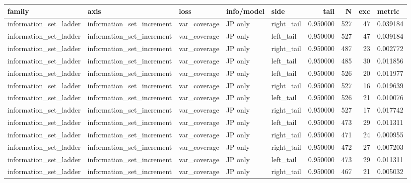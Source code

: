 \begin{tabular}{lllllrrr}
\toprule
family & axis & loss & info/model & side & tail & N & exc & metric \\
\midrule
information\_set\_ladder & information\_set\_increment & var\_coverage & JP only & right\_tail & 0.950000 & 527 & 47 & 0.039184 \\
information\_set\_ladder & information\_set\_increment & var\_coverage & JP only & left\_tail & 0.950000 & 527 & 47 & 0.039184 \\
information\_set\_ladder & information\_set\_increment & var\_coverage & JP only & right\_tail & 0.950000 & 487 & 23 & 0.002772 \\
information\_set\_ladder & information\_set\_increment & var\_coverage & JP only & left\_tail & 0.950000 & 485 & 30 & 0.011856 \\
information\_set\_ladder & information\_set\_increment & var\_coverage & JP only & left\_tail & 0.950000 & 526 & 20 & 0.011977 \\
information\_set\_ladder & information\_set\_increment & var\_coverage & JP only & right\_tail & 0.950000 & 527 & 16 & 0.019639 \\
information\_set\_ladder & information\_set\_increment & var\_coverage & JP only & left\_tail & 0.950000 & 526 & 21 & 0.010076 \\
information\_set\_ladder & information\_set\_increment & var\_coverage & JP only & right\_tail & 0.950000 & 527 & 17 & 0.017742 \\
information\_set\_ladder & information\_set\_increment & var\_coverage & JP only & left\_tail & 0.950000 & 473 & 29 & 0.011311 \\
information\_set\_ladder & information\_set\_increment & var\_coverage & JP only & right\_tail & 0.950000 & 471 & 24 & 0.000955 \\
information\_set\_ladder & information\_set\_increment & var\_coverage & JP only & right\_tail & 0.950000 & 472 & 27 & 0.007203 \\
information\_set\_ladder & information\_set\_increment & var\_coverage & JP only & left\_tail & 0.950000 & 473 & 29 & 0.011311 \\
information\_set\_ladder & information\_set\_increment & var\_coverage & JP only & right\_tail & 0.950000 & 467 & 21 & 0.005032 \\

\end{tabular}
